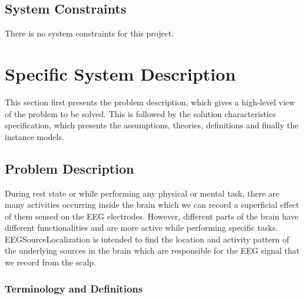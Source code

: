 \documentclass[12pt]{article}
\renewcommand{\progname}{EEGSourceLocalization}
\begin{document}
\subsection{System Constraints}

There is no system constraints for this project.



\section{Specific System Description}

This section first presents the problem description, which gives a high-level
view of the problem to be solved.  This is followed by the solution characteristics
specification, which presents the assumptions, theories, definitions and finally
the instance models.  

\subsection{Problem Description} \label{Sec_pd}

During rest state or while performing any physical or mental task, there are many activities occurring inside the brain which we can record a superficial effect of them sensed on the EEG electrodes. However, different parts of the brain have different functionalities and are more active while performing specific tasks.
\progname{} is intended to find the location and activity pattern of the underlying sources in the brain which are responsible for the EEG signal that we record from the scalp.

\subsubsection{Terminology and  Definitions}
\end{document}
